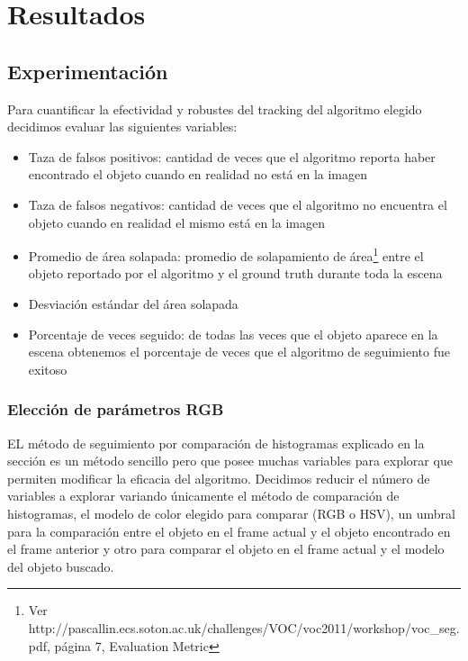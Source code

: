 \chapter{Resultados}

\section{Experimentación}



Para cuantificar la efectividad y robustes del tracking del algoritmo elegido decidimos evaluar las siguientes variables:
\begin{itemize}
	\item Taza de falsos positivos: cantidad de veces que el algoritmo reporta haber encontrado el objeto cuando en realidad no está en la imagen
	\item Taza de falsos negativos: cantidad de veces que el algoritmo no encuentra el objeto cuando en realidad el mismo está en la imagen
	\item Promedio de área solapada: promedio de solapamiento de área\footnote{Ver http://pascallin.ecs.soton.ac.uk/challenges/VOC/voc2011/workshop/voc\_seg.pdf, página 7, Evaluation Metric} entre el objeto reportado por el algoritmo y el ground truth durante toda la escena
	\item Desviación estándar del área solapada
	\item Porcentaje de veces seguido: de todas las veces que el objeto aparece en la escena obtenemos el porcentaje de veces que el algoritmo de seguimiento fue exitoso	
\end{itemize}

\subsection{Elección de parámetros RGB}
EL método de seguimiento por comparación de histogramas explicado en la sección  es un método sencillo pero que posee muchas variables para explorar que permiten modificar la eficacia del algoritmo. Decidimos reducir el número de variables a explorar variando únicamente el método de comparación de histogramas, el modelo de color elegido para comparar (RGB o HSV), un umbral para la comparación entre el objeto en el frame actual y el objeto encontrado en el frame anterior y otro para comparar el objeto en el frame actual y el modelo del objeto buscado.

